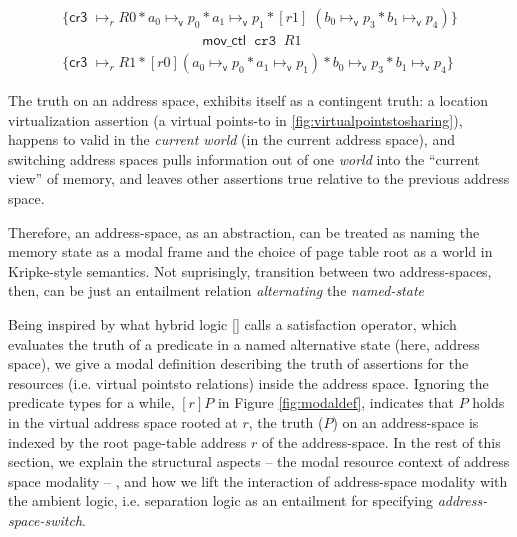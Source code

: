 \begin{figure}
\[
\begin{array}{l}
  \{ \textsf{cr3 } \mapsto_{r} R0 \ast a_0 \mapsto_{\textsf{v}}p_0  \ast a_1 \mapsto_{\textsf{v}}p_1  \ast [r1]\;( b_0 \mapsto_{\textsf{v}}p_3  \ast b_1 \mapsto_{\textsf{v}}p_4 )\}\\
  \qquad \qquad \qquad \qquad \qquad \mathsf{mov\_ctl} \;\; \texttt{cr3} \; \; R1\\

  \{ \textsf{cr3 } \mapsto_{r} R1 \ast [r0](a_0 \mapsto_{\textsf{v}}p_0  \ast a_1 \mapsto_{\textsf{v}}p_1)  \ast  b_0 \mapsto_{\textsf{v}}p_3  \ast b_1 \mapsto_{\textsf{v}}p_4 \}
  \end{array}
\]
  \label{fig:addrswitch}
  \end{figure}

\begin{remark}
  \label{remark:pattern}
The truth on an address space, exhibits itself as a contingent truth: a location virtualization assertion (a virtual points-to in \ref{fig:virtualpointstosharing}),  happens to valid in the \textit{current world} (in the current address space), and switching address spaces pulls information out of one \textit{world} into the “current view” of memory, and leaves other assertions true relative to the previous address space.

Therefore, an address-space, as an abstraction, can be treated as naming the memory state as a modal frame and the choice of page table root as a world in Kripke-style semantics. Not suprisingly, transition between two address-spaces, then, can be just an entailment relation \textit{alternating} the \textit{named-state}

Being inspired by what hybrid logic \ref{} calls a satisfaction operator, which evaluates the truth of a predicate in a named alternative state (here, address space), we give a modal definition describing the truth of assertions for the resources (i.e. virtual pointsto relations) inside the address space. Ignoring the predicate types for a while, $[r]P$ in Figure \ref{fig:modaldef}, indicates that $P$ holds in the virtual address space rooted at $r$, the truth ($P$) on an address-space is indexed by the root page-table address $r$ of the address-space. In the rest of this section, we explain the structural aspects -- the modal resource context of address space modality -- , and how we lift the interaction of address-space modality with the ambient logic, i.e. separation logic as an entailment for specifying \textit{address-space-switch}.


\end{remark}
